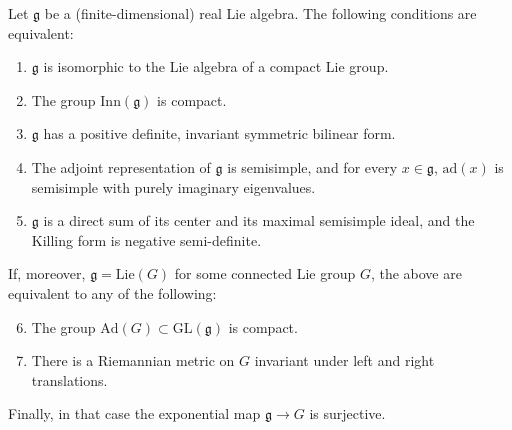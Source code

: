\begin{proposition}
 \label{proposition-compact-Lie}
Let $\mathfrak g$ be a (finite-dimensional) real Lie algebra. The following conditions are equivalent:
\begin{enumerate}
 \item $\mathfrak g$ is isomorphic to the Lie algebra of a compact Lie group.
 \item The group $\text{Inn}(\mathfrak g)$ is compact.
 \item $\mathfrak g$ has a positive definite, invariant symmetric bilinear form.
 \item The adjoint representation of $\mathfrak g$ is semisimple, and for every $x\in \mathfrak g$, $\text{ad}(x)$ is semisimple with purely imaginary eigenvalues.
 \item $\mathfrak g$ is a direct sum of its center and its maximal semisimple ideal, and the Killing form is negative semi-definite. 
\end{enumerate}

If, moreover, $\mathfrak g = \text{Lie}(G)$ for some connected Lie group $G$, the above are equivalent to any of the following:
\begin{enumerate}\setcounter{enumi}{5}
 \item The group $\text{Ad}(G)\subset \text{GL}(\mathfrak g)$ is compact.
 \item There is a Riemannian metric on $G$ invariant under left and right translations.
\end{enumerate}

Finally, in that case the exponential map $\mathfrak g \to G$ is surjective.
\end{proposition}

